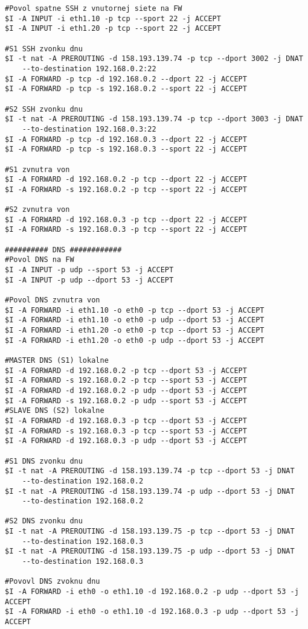 {\begin{small}
\begin{verbatim}
#Povol spatne SSH z vnutornej siete na FW
$I -A INPUT -i eth1.10 -p tcp --sport 22 -j ACCEPT
$I -A INPUT -i eth1.20 -p tcp --sport 22 -j ACCEPT

#S1 SSH zvonku dnu
$I -t nat -A PREROUTING -d 158.193.139.74 -p tcp --dport 3002 -j DNAT 
	--to-destination 192.168.0.2:22
$I -A FORWARD -p tcp -d 192.168.0.2 --dport 22 -j ACCEPT
$I -A FORWARD -p tcp -s 192.168.0.2 --sport 22 -j ACCEPT

#S2 SSH zvonku dnu
$I -t nat -A PREROUTING -d 158.193.139.74 -p tcp --dport 3003 -j DNAT 
	--to-destination 192.168.0.3:22
$I -A FORWARD -p tcp -d 192.168.0.3 --dport 22 -j ACCEPT
$I -A FORWARD -p tcp -s 192.168.0.3 --sport 22 -j ACCEPT

#S1 zvnutra von
$I -A FORWARD -d 192.168.0.2 -p tcp --dport 22 -j ACCEPT
$I -A FORWARD -s 192.168.0.2 -p tcp --sport 22 -j ACCEPT

#S2 zvnutra von
$I -A FORWARD -d 192.168.0.3 -p tcp --dport 22 -j ACCEPT
$I -A FORWARD -s 192.168.0.3 -p tcp --sport 22 -j ACCEPT

########## DNS ############
#Povol DNS na FW
$I -A INPUT -p udp --sport 53 -j ACCEPT
$I -A INPUT -p udp --dport 53 -j ACCEPT

#Povol DNS zvnutra von
$I -A FORWARD -i eth1.10 -o eth0 -p tcp --dport 53 -j ACCEPT
$I -A FORWARD -i eth1.10 -o eth0 -p udp --dport 53 -j ACCEPT
$I -A FORWARD -i eth1.20 -o eth0 -p tcp --dport 53 -j ACCEPT
$I -A FORWARD -i eth1.20 -o eth0 -p udp --dport 53 -j ACCEPT

#MASTER DNS (S1) lokalne
$I -A FORWARD -d 192.168.0.2 -p tcp --dport 53 -j ACCEPT
$I -A FORWARD -s 192.168.0.2 -p tcp --sport 53 -j ACCEPT
$I -A FORWARD -d 192.168.0.2 -p udp --dport 53 -j ACCEPT
$I -A FORWARD -s 192.168.0.2 -p udp --sport 53 -j ACCEPT
#SLAVE DNS (S2) lokalne
$I -A FORWARD -d 192.168.0.3 -p tcp --dport 53 -j ACCEPT
$I -A FORWARD -s 192.168.0.3 -p tcp --sport 53 -j ACCEPT
$I -A FORWARD -d 192.168.0.3 -p udp --dport 53 -j ACCEPT

#S1 DNS zvonku dnu
$I -t nat -A PREROUTING -d 158.193.139.74 -p tcp --dport 53 -j DNAT 
	--to-destination 192.168.0.2
$I -t nat -A PREROUTING -d 158.193.139.74 -p udp --dport 53 -j DNAT 
	--to-destination 192.168.0.2

#S2 DNS zvonku dnu
$I -t nat -A PREROUTING -d 158.193.139.75 -p tcp --dport 53 -j DNAT 
	--to-destination 192.168.0.3
$I -t nat -A PREROUTING -d 158.193.139.75 -p udp --dport 53 -j DNAT 
	--to-destination 192.168.0.3

#Povovl DNS zvoknu dnu
$I -A FORWARD -i eth0 -o eth1.10 -d 192.168.0.2 -p udp --dport 53 -j ACCEPT
$I -A FORWARD -i eth0 -o eth1.10 -d 192.168.0.3 -p udp --dport 53 -j ACCEPT


\end{verbatim}
\end{small}}
